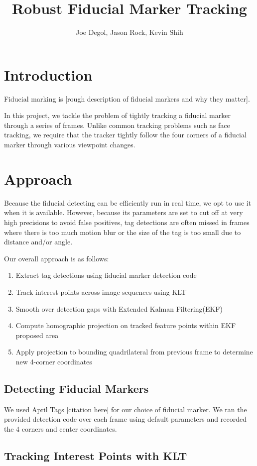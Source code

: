 \documentclass[12pt]{article}
\title{Robust Fiducial Marker Tracking}
\author{Joe Degol, Jason Rock, Kevin Shih}
\begin{document}
\maketitle

\section{Introduction}
Fiducial marking is [rough description of fiducial markers and why they matter].

In this project, we tackle the problem of tightly tracking a fiducial marker through a series of frames. Unlike common tracking problems such as face tracking, we require that the tracker tightly follow the four corners of a fiducial marker through various viewpoint changes. 

\section{Approach}
Because the fiducial detecting can be efficiently run in real time, we opt to use it when it is available. However, because its parameters are set to cut off at very high precisions to avoid false positives, tag detections are often missed in frames where there is too much motion blur or the size of the tag is too small due to distance and/or angle.

Our overall approach is as follows:
\begin{enumerate}
\item Extract tag detections using fiducial marker detection code
\item Track interest points across image sequences using KLT
\item Smooth over detection gaps with Extended Kalman Filtering(EKF)
\item Compute homographic projection on tracked feature points within EKF proposed area
\item Apply projection to bounding quadrilateral from previous frame to determine new 4-corner coordinates
\end{enumerate}

\subsection{Detecting Fiducial Markers}
We used April Tags [citation here] for our choice of fiducial marker. We ran the provided detection code over each frame using default parameters and recorded the 4 corners and center coordinates.
\subsection{Tracking Interest Points with KLT}
\end{document}
